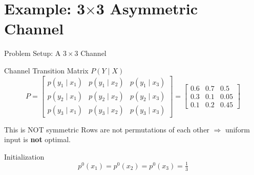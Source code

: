 \documentclass{beamer}
\begin{document}

\section{Example: 3$\times$3 Asymmetric Channel}

\begin{frame}{Problem Setup: A $3 \times 3$ Channel}
    \begin{block}{Channel Transition Matrix $P(Y \mid X)$}
        $$
            P =
            \begin{bmatrix}
                p(y_1 \mid x_1) & p(y_1 \mid x_2) & p(y_1 \mid x_3) \\
                p(y_2 \mid x_1) & p(y_2 \mid x_2) & p(y_2 \mid x_3) \\
                p(y_3 \mid x_1) & p(y_3 \mid x_2) & p(y_3 \mid x_3)
            \end{bmatrix}
            =
            \begin{bmatrix}
                0.6 & 0.7 & 0.5 \\
                0.3 & 0.1 & 0.05 \\
                0.1 & 0.2 & 0.45
            \end{bmatrix}
        $$
    \end{block}

    \begin{alertblock}{This is NOT symmetric}
        Rows are not permutations of each other $\Rightarrow$ uniform input is \textbf{not} optimal.
    \end{alertblock}

    \begin{block}{Initialization}
        $$
            p^0(x_1) = p^0(x_2) = p^0(x_3) = \tfrac{1}{3}
        $$
    \end{block}
\end{frame}
\end{document}
